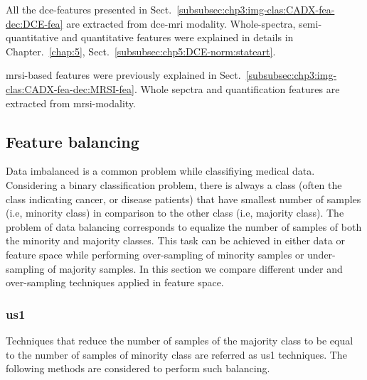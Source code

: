 All the \ac{dce}-features presented in Sect.~\ref{subsubsec:chp3:img-clas:CADX-fea-dec:DCE-fea} are extracted from \ac{dce}-\ac{mri} modality.
Whole-spectra, semi-quantitative and quantitative features were explained in details in Chapter.~\ref{chap:5}, Sect.~\ref{subsubsec:chp5:DCE-norm:stateart}.

\ac{mrsi}-based features were previously explained in Sect.~\ref{subsubsec:chp3:img-clas:CADX-fea-dec:MRSI-fea}. 
Whole sepctra and quantification features are extracted from \ac{mrsi}-modality.
  
\subsection{Feature balancing}\label{subsec:chp6:method:fea-bal}
Data imbalanced is a common problem while classifiying medical data.
Considering a binary classification problem, there is always a class (often the class indicating cancer, or disease patients) that have smallest number of samples (i.e, minority class) in comparison to the other class (i.e, majority class).
The problem of data balancing corresponds to equalize the number of samples of both the minority and majority classes.
This task can be achieved in either data or feature space while performing over-sampling of minority samples or under-sampling of majority samples.
In this section we compare different under and over-sampling techniques applied in feature space.

\subsubsection{\Acl*{us1}}
Techniques that reduce the number of samples of the majority class to be equal to the number of samples of minority class are referred as \ac{us1} techniques.
The following methods are considered to perform such balancing.

